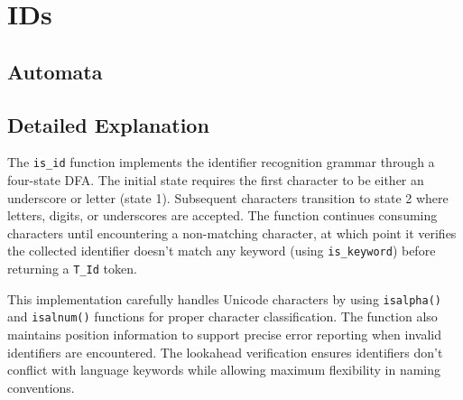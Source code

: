 \documentclass[12pt, a4paper]{report}
\begin{document}
\section{IDs}


\subsection{Automata}

\begin{center}
\end{center}

\subsection{Detailed Explanation}
The \texttt{is\_id} function implements the identifier recognition grammar through a four-state DFA. The initial state requires the first character to be either an underscore or letter (state 1). Subsequent characters transition to state 2 where letters, digits, or underscores are accepted. The function continues consuming characters until encountering a non-matching character, at which point it verifies the collected identifier doesn't match any keyword (using \texttt{is\_keyword}) before returning a \texttt{T\_Id} token.

This implementation carefully handles Unicode characters by using \texttt{isalpha()} and \texttt{isalnum()} functions for proper character classification. The function also maintains position information to support precise error reporting when invalid identifiers are encountered. The lookahead verification ensures identifiers don't conflict with language keywords while allowing maximum flexibility in naming conventions.
\end{document}
